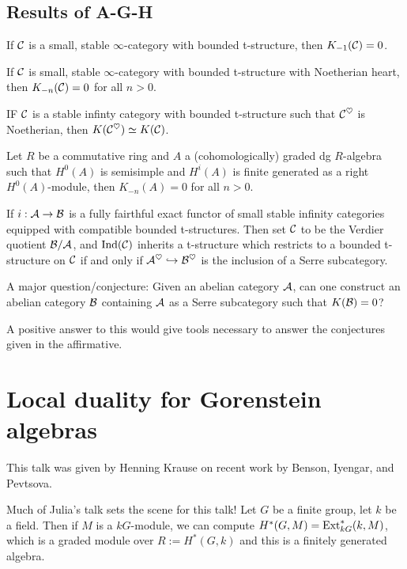\documentclass[12pt]{article}
\begin{document}
\subsection{Results of A-G-H}
\begin{thm}
	If $\mathcal{C}$ is a small, stable $\infty$-category with bounded t-structure, then $K_{-1}(\mathcal{C})=0$.
\end{thm}
\begin{thm}
	If $\mathcal{C}$ is small, stable $\infty$-category with bounded t-structure with Noetherian heart, then $K_{-n}(\mathcal{C})=0$ for all $n>0$.
\end{thm}
\begin{thm}
	IF $\mathcal{C}$ is a stable infinty category with bounded t-structure such that $\mathcal{C}^\heartsuit$ is Noetherian, then $K(\mathcal{C}^\heartsuit)\simeq K(\mathcal{C})$.
\end{thm}	
\begin{thm}
	Let $R$ be a commutative ring and $A$ a (cohomologically) graded dg $R$-algebra such that $H^0(A)$ is semisimple and $H^i(A)$ is finite generated as a right $H^0(A)$-module,
	then $K_{-n}(A)=0$ for all $n>0$.
\end{thm}
\begin{thm}
	If $i:\mathcal{A}\to \mathcal{B}$ is a fully fairthful exact functor of small stable infinity categories equipped with compatible bounded t-structures. Then set $\mathcal{C}$ to be the Verdier quotient $\mathcal{B}/\mathcal{A}$,
	and $\operatorname{Ind}(\mathcal{C})$ inherits a t-structure which restricts to a bounded t-structure on $\mathcal{C}$ if and only if $\mathcal{A}^\heartsuit\hookrightarrow \mathcal{B}^\heartsuit$ is the inclusion of a Serre subcategory.
\end{thm}

A major question/conjecture: Given an abelian category $\mathcal{A}$, can one construct an abelian category $\mathcal{B}$ containing $\mathcal{A}$ as a Serre subcategory such that $K(\mathcal{B})=0$?

A positive answer to this would give tools necessary to answer the conjectures given in the affirmative.

\section{Local duality for Gorenstein algebras}
This talk was given by Henning Krause on recent work by Benson, Iyengar, and Pevtsova.

Much of Julia's talk sets the scene for this talk! Let $G$ be a finite group, let $k$ be a field. Then if $M$ is a $kG$-module, 
we can compute $H^\ast(G,M)=\operatorname{Ext}^\ast_{kG}(k,M)$, which is a graded module over $R:=H^\ast(G,k)$ and this is a finitely generated algebra.
\end{document}
